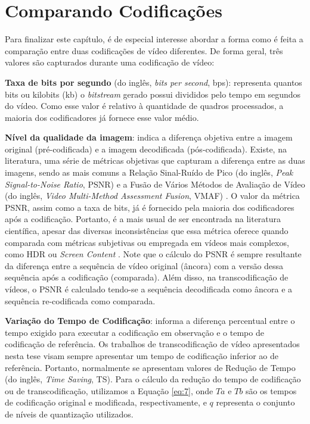 \section{Comparando Codificações}
\label{cap:2.5}

Para finalizar este capítulo, é de especial interesse abordar a forma como é feita a comparação entre duas codificações de vídeo diferentes. De forma geral, três valores são capturados durante uma codificação de vídeo: 

\textbf{Taxa de bits por segundo} (do inglês, \textit{bits per second}, bps): representa quantos bits ou kilobits (kb) o \textit{bitstream} gerado possui divididos pelo tempo em segundos do vídeo. Como esse valor é relativo à quantidade de quadros processados, a maioria dos codificadores já fornece esse valor médio.

\textbf{Nível da qualidade da imagem}: indica a diferença objetiva entre a imagem original (pré-codificada) e a imagem decodificada (pós-codificada). Existe, na literatura, uma série de métricas objetivas que capturam a diferença entre as duas imagens, sendo as mais comuns a Relação Sinal-Ruído de Pico (do inglês, \textit{Peak Signal-to-Noise Ratio}, PSNR) \cite{bib:psnr} e a Fusão de Vários Métodos de Avaliação de Vídeo (do inglês, \textit{Video Multi-Method Assessment Fusion}, VMAF) \cite{bib:vmaf}. O valor da métrica PSNR, assim como a taxa de bits, já é fornecido pela maioria dos codificadores após a codificação. Portanto, é a mais usual de ser encontrada na literatura científica, apesar das diversas inconsistências que essa métrica oferece quando comparada com métricas subjetivas ou empregada em vídeos mais complexos, como HDR ou \textit{Screen Content} \cite{bib:mse_wrong}. Note que o cálculo do PSNR é sempre resultante da diferença entre a sequência de vídeo original (âncora) com a versão dessa sequência após a codificação (comparada). Além disso, na transcodificação de vídeos, o PSNR é calculado tendo-se a sequência decodificada como âncora e a sequência re-codificada como comparada.

\textbf{Variação do Tempo de Codificação}: informa a diferença percentual entre o tempo exigido para executar a codificação em observação e o tempo de codificação de referência. Os trabalhos de transcodificação de vídeo apresentados nesta tese visam sempre apresentar um tempo de codificação inferior ao de referência. Portanto, normalmente se apresentam valores de Redução de Tempo (do inglês, \textit{Time Saving}, TS). Para o cálculo da redução do tempo de codificação ou de transcodificação, utilizamos a Equação \ref{eq:7}, onde $Ta$ e $Tb$ são os tempos de codificação original e modificada, respectivamente, e $q$ representa o conjunto de níveis de quantização utilizados.

